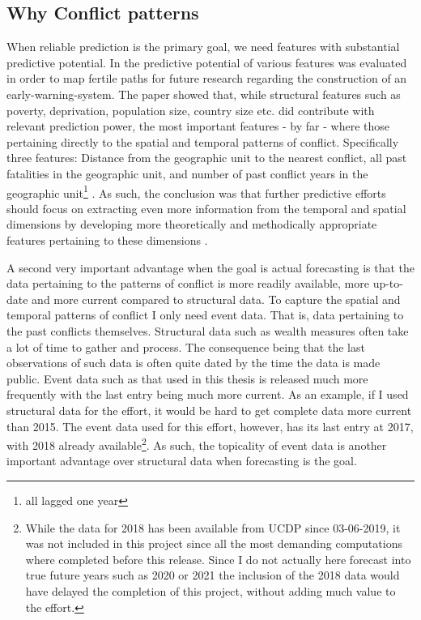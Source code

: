 \documentclass[a4paper]{article}
\begin{document}
\subsection{Why Conflict patterns}

When reliable prediction is the primary goal, we need features with substantial predictive potential. In \cite{Maase} the predictive potential of various features was evaluated in order to map fertile paths for future research regarding the construction of an early-warning-system. The paper showed that, while structural features such as poverty, deprivation, population size, country size etc. did contribute with relevant prediction power, the most important features - by far - where those pertaining directly to the spatial and temporal patterns of conflict. Specifically three features: Distance from the geographic unit to the nearest conflict, all past fatalities in the geographic unit, and number of past conflict years in the geographic unit\footnote{all lagged one year} \citep[17-18]{Maase}. As such, the conclusion was that further predictive efforts should focus on extracting even more information from the temporal and spatial dimensions by developing more theoretically and methodically appropriate features pertaining to these dimensions \citep[21-23]{Maase}.\par

A second very important advantage when the goal is actual forecasting is that the data pertaining to the patterns of conflict is more readily available, more up-to-date and more current compared to structural data. To capture the spatial and temporal patterns of conflict I only need event data. That is, data pertaining to the past conflicts themselves. Structural data such as wealth measures often take a lot of time to gather and process. The consequence being that the last observations of such data is often quite dated by the time the data is made public. Event data such as that used in this thesis is released much more frequently with the last entry being much more current. As an example, if I used structural data for the effort, it would be hard to get complete data more current than 2015. The event data used for this effort, however, has its last entry at 2017, with 2018 already available\footnote{While the data for 2018 has been available from UCDP since 03-06-2019, it was not included in this project since all the most demanding computations where completed before this release. Since I do not actually here forecast into true future years such as 2020 or 2021 the inclusion of the 2018 data would have delayed the completion of this project, without adding much value to the effort.}. As such, the topicality of event data is another important advantage over structural data when forecasting is the goal.\par
\end{document}
